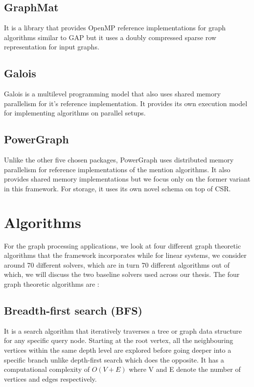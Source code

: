\subsection{GraphMat}
It is a library that provides OpenMP reference implementations for graph algorithms similar to GAP but it uses a doubly compressed sparse row representation for input graphs.

\subsection{Galois}
Galois is a multilevel programming model that also uses shared memory parallelism for it's reference implementation. It provides its own execution model for implementing algorithms on parallel setups.

\subsection{PowerGraph}
Unlike the other five chosen packages, PowerGraph uses distributed memory parallelism for reference implementations of  the mention algorithms. It also provides shared memory implementations but we focus only on the former variant in this framework. For storage, it uses its own novel schema on top of CSR.


\section{Algorithms}
For the graph processing applications, we look at four different graph theoretic algorithms that the framework incorporates while for linear systems, we consider around 70 different solvers, which are in turn 70 different algorithms out of which, we will discuss the two baseline solvers used across our thesis. The four graph theoretic algorithms are :
\subsection{Breadth-first search (BFS)}
It is a search algorithm that iteratively traverses a tree or graph data structure for any specific query node. Starting at the root vertex, all the neighbouring vertices within the same depth level are explored before going deeper into a specific branch unlike depth-first search which does the opposite. It has a computational complexity of $O(V+E)$ where V and E denote the number of vertices and edges respectively. 
